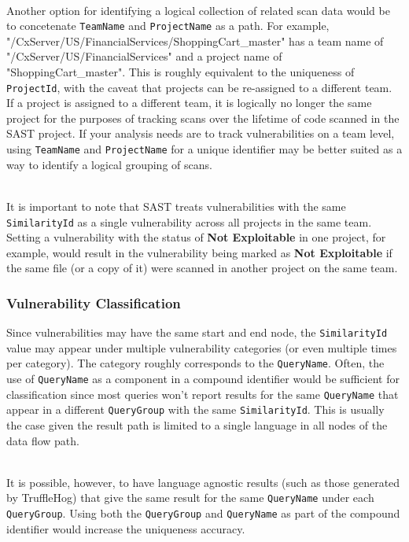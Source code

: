 \noindent\\Another option for identifying a logical collection of related scan data would be to concetenate \texttt{TeamName} and \texttt{ProjectName} as a path.  
For example, "/CxServer/US/FinancialServices/ShoppingCart\_master" has a team name of "/CxServer/US/FinancialServices" and a project name of "ShoppingCart\_master".
This is roughly equivalent to the uniqueness of \texttt{ProjectId}, with the caveat that projects can be re-assigned to a different team.  If a project is assigned
to a different team, it is logically no longer the same project for the purposes of tracking scans over the lifetime of code scanned in the SAST project.  If your
analysis needs are to track vulnerabilities on a team level, using \texttt{TeamName} and \texttt{ProjectName} for a unique identifier may be better suited as
a way to identify a logical grouping of scans.

\noindent\\It is important to note that SAST treats vulnerabilities with the same \texttt{SimilarityId} as a single vulnerability across all projects in the same team.  
Setting a vulnerability with the status of \textbf{Not Exploitable} in one project, for example, would result in the vulnerability being marked 
as \textbf{Not Exploitable} if the same file (or a copy of it) were scanned in another project on the same team.


\subsubsection{Vulnerability Classification}

Since vulnerabilities may have the same start and end node, the \texttt{SimilarityId} value may appear under multiple vulnerability categories 
(or even multiple times per category).  The category roughly corresponds to the \texttt{QueryName}.  Often, the use of \texttt{QueryName} as a component in a 
compound identifier would be sufficient for classification since most queries won't report results for the same \texttt{QueryName} that appear in a 
different \texttt{QueryGroup} with the same \texttt{SimilarityId}.  This is usually the case given the result path is limited to a single language in all nodes of the
data flow path.

\noindent\\It is possible, however, to have language agnostic results (such as those generated by TruffleHog) that give the same result for the same 
\texttt{QueryName} under each \texttt{QueryGroup}.  Using both the \texttt{QueryGroup} and \texttt{QueryName} as part of the compound identifier would increase the 
uniqueness accuracy.

